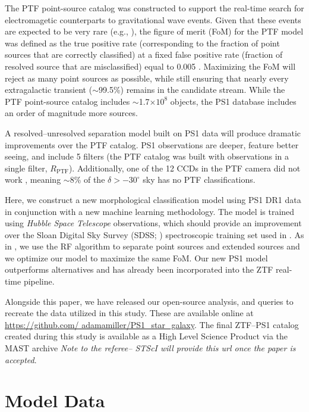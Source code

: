 \documentclass[twocolumn]{aastex62}
\begin{document}
\begin{CJK*}{UTF8}{gbsn}
The PTF point-source catalog was constructed to support the real-time search
for electromagetic counterparts to gravitational wave events. Given that
these events are expected to be very rare (e.g., \citealt{Scolnic18}), the
figure of merit (FoM) for the PTF model was defined as the true positive
rate (corresponding to the fraction of point sources that are correctly
classified) at a fixed false positive rate (fraction of resolved source that
are misclassified) equal to 0.005 \citep{Miller17}. Maximizing the FoM will
reject as many point sources as possible, while still ensuring that nearly
every extragalactic transient ($\sim$99.5\%) remains in the candidate
stream. While the PTF point-source catalog includes $\sim$1.7$\times 10^8$
objects, the PS1 database includes an order of magnitude more sources.

A resolved--unresolved separation model built on PS1 data will produce
dramatic improvements over the PTF catalog. PS1 observations are deeper,
feature better seeing, and include 5 filters (the PTF catalog was built with
observations in a single filter, $R_\mathrm{PTF}$). Additionally, one of the
12 CCDs in the PTF camera did not work \citep{Law09}, meaning $\sim$8\% of
the $\delta > -30^\circ$ sky has no PTF classifications.

Here, we construct a new morphological classification model using PS1 DR1
data in conjunction with a new machine learning methodology. The model is
trained using \textit{Hubble Space Telescope} observations, which should
provide an improvement over the Sloan Digital Sky Survey (SDSS;
\citealt{York00}) spectroscopic training set used in \citet{Miller17}. As in
\citet{Miller17}, we use the RF algorithm to separate point sources and
extended sources and we optimize our model to maximize the same FoM. Our new
PS1 model outperforms alternatives and has already been incorporated into
the ZTF real-time pipeline. 

Alongside this paper, we have released our open-source analysis, and queries
to recreate the data utilized in this study. These are available online at
\url{https://github.com/ adamamiller/PS1_star_galaxy}. The final ZTF--PS1 catalog
created during this study is available as a High Level Science Product via
the MAST archive \textit{Note to the referee-- STScI will provide this url
once the paper is accepted}.

\section{Model Data}\label{sec:model_data}


\end{CJK*}
\end{document}

